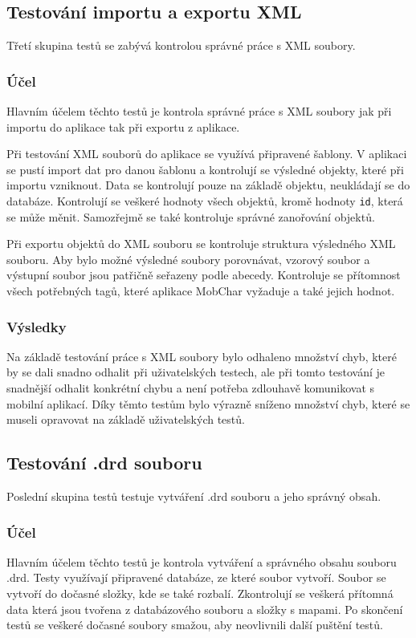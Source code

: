 \documentclass[thesis=B,czech]{resources/FITthesis}[2012/06/26]
\begin{document}
		\subsection{Testování importu a exportu XML}
Třetí skupina testů se zabývá kontrolou správné práce s XML soubory.

			\subsubsection*{Účel}
Hlavním účelem těchto testů je kontrola správné práce s XML soubory jak při importu do aplikace tak při exportu z aplikace. \par

Při testování XML souborů do aplikace se využívá připravené šablony. V aplikaci se pustí import dat pro danou šablonu a kontrolují se výsledné objekty, které při importu vzniknout. Data se kontrolují pouze na základě objektu, neukládají se do databáze. Kontrolují se veškeré hodnoty všech objektů, kromě hodnoty \texttt{id}, která se může měnit. Samozřejmě se také kontroluje správné zanořování objektů. \par

Při exportu objektů do XML souboru se kontroluje struktura výsledného XML souboru. Aby bylo možné výsledné soubory porovnávat, vzorový soubor a výstupní soubor jsou patřičně seřazeny podle abecedy. Kontroluje se přítomnost všech potřebných tagů, které aplikace MobChar vyžaduje a také jejich hodnot.

			\subsubsection*{Výsledky}
Na základě testování práce s XML soubory bylo odhaleno množství chyb, které by se dali snadno odhalit při uživatelských testech, ale při tomto testování je snadnější odhalit konkrétní chybu a není potřeba zdlouhavě komunikovat s mobilní aplikací. Díky těmto testům bylo výrazně sníženo množství chyb, které se museli opravovat na základě uživatelských testů. 

	\subsection{Testování .drd souboru}
Poslední skupina testů testuje vytváření .drd souboru a jeho správný obsah.

			\subsubsection*{Účel}
Hlavním účelem těchto testů je kontrola vytváření a správného obsahu souboru .drd. Testy využívají připravené databáze, ze které soubor vytvoří. Soubor se vytvoří do dočasné složky, kde se také rozbalí. Zkontrolují se veškerá přítomná data která jsou tvořena z databázového souboru a složky s mapami. Po skončení testů se veškeré dočasné soubory smažou, aby neovlivnili další puštění testů.
\end{document}
